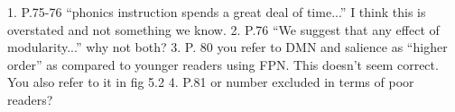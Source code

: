 1. P.75-76 “phonics instruction spends a great deal of time...” I think this is overstated and not something we know.
2. P.76 “We suggest that any effect of modularity...” why not both?
3. P. 80 you refer to DMN and salience as “higher order” as compared to younger readers using FPN. This doesn’t seem correct. You also refer to it in fig 5.2 
4. P.81 or number excluded in terms of poor readers?
